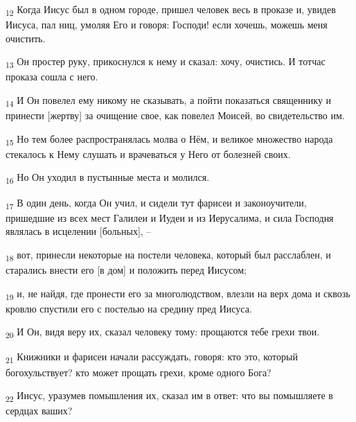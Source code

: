 \begin{tcolorbox}
\textsubscript{12} Когда Иисус был в одном городе, пришел человек весь в проказе и, увидев Иисуса, пал ниц, умоляя Его и говоря: Господи! если хочешь, можешь меня очистить.
\end{tcolorbox}
\begin{tcolorbox}
\textsubscript{13} Он простер руку, прикоснулся к нему и сказал: хочу, очистись. И тотчас проказа сошла с него.
\end{tcolorbox}
\begin{tcolorbox}
\textsubscript{14} И Он повелел ему никому не сказывать, а пойти показаться священнику и принести [жертву] за очищение свое, как повелел Моисей, во свидетельство им.
\end{tcolorbox}
\begin{tcolorbox}
\textsubscript{15} Но тем более распространялась молва о Нём, и великое множество народа стекалось к Нему слушать и врачеваться у Него от болезней своих.
\end{tcolorbox}
\begin{tcolorbox}
\textsubscript{16} Но Он уходил в пустынные места и молился.
\end{tcolorbox}
\begin{tcolorbox}
\textsubscript{17} В один день, когда Он учил, и сидели тут фарисеи и законоучители, пришедшие из всех мест Галилеи и Иудеи и из Иерусалима, и сила Господня являлась в исцелении [больных], --
\end{tcolorbox}
\begin{tcolorbox}
\textsubscript{18} вот, принесли некоторые на постели человека, который был расслаблен, и старались внести его [в дом] и положить перед Иисусом;
\end{tcolorbox}
\begin{tcolorbox}
\textsubscript{19} и, не найдя, где пронести его за многолюдством, влезли на верх дома и сквозь кровлю спустили его с постелью на средину пред Иисуса.
\end{tcolorbox}
\begin{tcolorbox}
\textsubscript{20} И Он, видя веру их, сказал человеку тому: прощаются тебе грехи твои.
\end{tcolorbox}
\begin{tcolorbox}
\textsubscript{21} Книжники и фарисеи начали рассуждать, говоря: кто это, который богохульствует? кто может прощать грехи, кроме одного Бога?
\end{tcolorbox}
\begin{tcolorbox}
\textsubscript{22} Иисус, уразумев помышления их, сказал им в ответ: что вы помышляете в сердцах ваших?
\end{tcolorbox}
